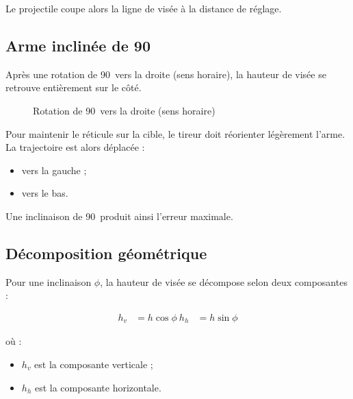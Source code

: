 Le projectile coupe alors la ligne de visée à la distance de réglage.

\subsection{Arme inclinée de 90\textdegree}

Après une rotation de 90\textdegree\ vers la droite (sens horaire), la hauteur de visée se retrouve entièrement sur le côté.

\begin{figure}[H]
\centering
{}
\caption{Rotation de 90\textdegree\ vers la droite (sens horaire)}
\end{figure}

Pour maintenir le réticule sur la cible, le tireur doit réorienter légèrement l'arme. La trajectoire est alors déplacée :

\begin{itemize}
\item vers la gauche ;
\item vers le bas.
\end{itemize}

Une inclinaison de 90\textdegree\ produit ainsi l'erreur maximale.

\subsection{Décomposition géométrique}

Pour une inclinaison $\phi$, la hauteur de visée se décompose selon deux composantes :

\begin{align}
h_v &= h \cos \phi \
h_h &= h \sin \phi
\end{align}

où :

\begin{itemize}
\item $h_v$ est la composante verticale ;
\item $h_h$ est la composante horizontale.
\end{itemize}

